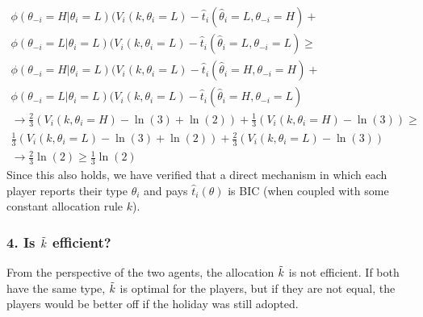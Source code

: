 \documentclass[a4paper]{article}
\begin{document}
	\begin{align}
		\phi(\theta_{-i}=H|\theta_{i}=L)(V_{i}(k,\theta_{i}=L)-\hat{t}_{i}(\hat{\theta}_{i}=L,\theta_{-i}=H) + \nonumber \\\phi(\theta_{-i}=L|\theta_{i}=L)(V_{i}(k,\theta_{i}=L)-\hat{t}_{i}(\hat{\theta}_{i}=L,\theta_{-i}=L) \geq \nonumber\\
		\phi(\theta_{-i}=H|\theta_{i}=L)(V_{i}(k,\theta_{i}=L)-\hat{t}_{i}(\hat{\theta}_{i}=H,\theta_{-i}=H) + \nonumber \\\phi(\theta_{-i}=L|\theta_{i}=L)(V_{i}(k,\theta_{i}=L)-\hat{t}_{i}(\hat{\theta}_{i}=H,\theta_{-i}=L)\\
		\rightarrow \frac{2}{3}(V_{i}(k,\theta_{i}=H)-\ln(3)+\ln(2))+\frac{1}{3}(V_{i}(k,\theta_{i}=H)-\ln(3)) \geq \nonumber\\ \frac{1}{3}(V_{i}(k,\theta_{i}=L)-\ln(3)+\ln(2))+\frac{2}{3}(V_{i}(k,\theta_{i}=L)-\ln(3))\\
		\rightarrow \frac{2}{3}\ln(2) \geq \frac{1}{3}\ln(2)
	\end{align}
	Since this also holds, we have verified that a direct mechanism in which each player reports their type $\theta_{i}$ and pays $\hat{t}_{i}(\theta)$ is BIC (when
	coupled with some constant allocation rule $k$).
	
	
	\subsubsection*{4. Is $\Tilde{k}$ efficient?}
	From the perspective of the two agents, the allocation $\Tilde{k}$ is not efficient. If both have the same type, $\Tilde{k}$ is optimal for the players, but if they are not equal, the players would be better off if the holiday was still adopted.
	
	
\end{document}
